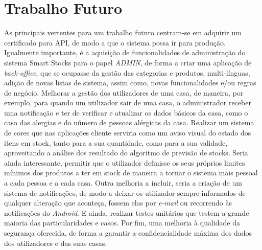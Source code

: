 \section{Trabalho Futuro}\label{sec43}

As principais vertentes para um trabalho futuro centram-se em adquirir um certificado para API, de modo a que o sistema possa ir para produção. Igualmente importante, é a aquisição de funcionalidades de administração do sistema Smart Stocks para o papel \textit{ADMIN}, de forma a criar uma aplicação de \textit{back-office}, que se ocupasse da gestão das categorias e produtos, multi-línguas, adição de novas listas de sistema, assim como, novas funcionalidades e/ou regras de negócio. Melhorar a gestão dos utilizadores de uma casa, de maneira, por exemplo, para quando um utilizador sair de uma casa, o administrador receber uma notificação e ter de verificar e atualizar os dados básicos da casa, como o caso das alergias e do número de pessoas alérgicas da casa. Realizar um sistema de cores que nas aplicações cliente serviria como um aviso visual do estado dos itens em stock, tanto para a sua quantidade, como para a sua validade, aproveitando a análise dos resultado do algoritmo de previsão de stocks. Seria ainda interessante, permitir que o utilizador definisse os seus próprios limites mínimos dos produtos a ter em stock de maneira a tornar o sistema mais pessoal a cada pessoa e a cada casa. Outra melhoria a incluir, seria a criação de um sistema de notificações, de modo a deixar os utilizador sempre informados de qualquer alteração que aconteça, fossem elas por \textit{e-mail} ou recorrendo às notificações do \textit{Android}. E ainda, realizar testes unitários que testem a grande maioria das particularidades e casos. Por fim, uma melhoria à qualidade da segurança oferecida, de forma a garantir a confidencialidade máxima dos dados dos utilizadores e das suas casas.
